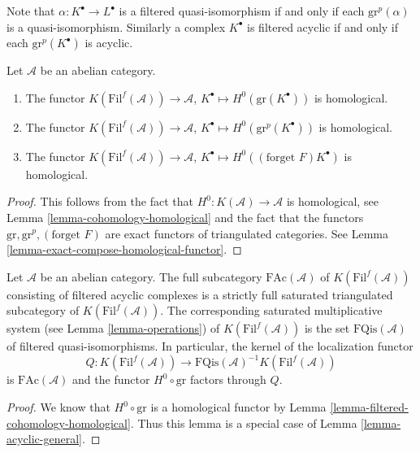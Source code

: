 \noindent
Note that $\alpha : K^\bullet \to L^\bullet$ is a filtered quasi-isomorphism
if and only if each $\text{gr}^p(\alpha)$ is a quasi-isomorphism. Similarly
a complex $K^\bullet$ is filtered acyclic if and only if each
$\text{gr}^p(K^\bullet)$ is acyclic.

\begin{lemma}
\label{lemma-filtered-cohomology-homological}
Let $\mathcal{A}$ be an abelian category.
\begin{enumerate}
\item The functor
$K(\text{Fil}^f(\mathcal{A})) \longrightarrow \mathcal{A}$,
$K^\bullet \longmapsto H^0(\text{gr}(K^\bullet))$
is homological.
\item The functor
$K(\text{Fil}^f(\mathcal{A})) \rightarrow \mathcal{A}$,
$K^\bullet \longmapsto H^0(\text{gr}^p(K^\bullet))$
is homological.
\item The functor
$K(\text{Fil}^f(\mathcal{A})) \longrightarrow \mathcal{A}$,
$K^\bullet \longmapsto H^0((\text{forget }F)K^\bullet)$
is homological.
\end{enumerate}
\end{lemma}

\begin{proof}
This follows from the fact that
$H^0 : K(\mathcal{A}) \to \mathcal{A}$ is homological, see
Lemma \ref{lemma-cohomology-homological}
and the fact that the functors $\text{gr}, \text{gr}^p, (\text{forget }F)$
are exact functors of triangulated categories. See
Lemma \ref{lemma-exact-compose-homological-functor}.
\end{proof}

\begin{lemma}
\label{lemma-filtered-acyclic}
Let $\mathcal{A}$ be an abelian category. The full subcategory
$\text{FAc}(\mathcal{A})$ of $K(\text{Fil}^f(\mathcal{A}))$
consisting of filtered acyclic complexes is a strictly full saturated
triangulated subcategory of $K(\text{Fil}^f(\mathcal{A}))$.
The corresponding saturated multiplicative system (see
Lemma \ref{lemma-operations})
of $K(\text{Fil}^f(\mathcal{A}))$ is the set
$\text{FQis}(\mathcal{A})$ of filtered quasi-isomorphisms.
In particular, the kernel of the localization
functor
$$
Q :
K(\text{Fil}^f(\mathcal{A}))
\longrightarrow
\text{FQis}(\mathcal{A})^{-1}K(\text{Fil}^f(\mathcal{A}))
$$
is $\text{FAc}(\mathcal{A})$ and the functor $H^0 \circ \text{gr}$
factors through $Q$.
\end{lemma}

\begin{proof}
We know that $H^0 \circ \text{gr}$ is a homological functor by
Lemma \ref{lemma-filtered-cohomology-homological}.
Thus this lemma is a special case of
Lemma \ref{lemma-acyclic-general}.
\end{proof}

